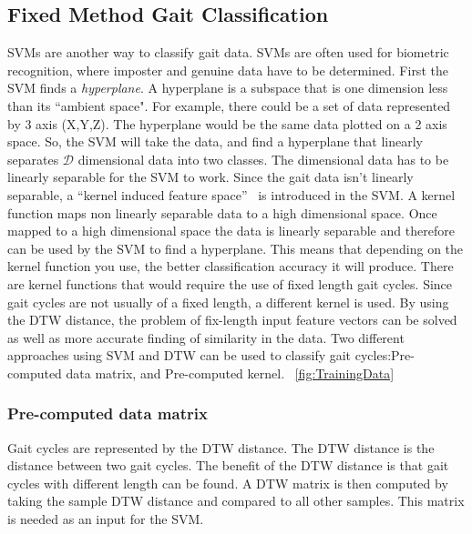 \documentclass{sig-alternate}
\begin{document}
\subsection{Fixed Method Gait Classification}\label{FMGC}
	SVMs are another way to classify gait data. SVMs are often used for biometric recognition, where imposter and genuine data have to be determined. First the SVM finds a \textit{hyperplane}. A hyperplane is a subspace that is one dimension less than its ``ambient space". For example, there could be a set of data represented by 3 axis (X,Y,Z). The hyperplane would be the same data plotted on a 2 axis space. So, the SVM will take the data, and find a hyperplane that linearly separates \begin{math}\mathcal{D} \end{math} dimensional data into two classes. The dimensional data has to be linearly separable for the SVM to work. Since the gait data isn't linearly separable, a ``kernel induced feature space''~\cite{Muaaz:2013} is introduced in the SVM. A kernel function maps non linearly separable data to a high dimensional space. Once mapped to a high dimensional space the data is linearly separable and therefore can be used by the SVM to find a hyperplane. This means that depending on the kernel function you use, the better classification accuracy it will produce. 
There are kernel functions that would require the use of fixed length gait cycles. Since gait cycles are not usually of a fixed length, a different kernel is used. By using the DTW distance, the problem of fix-length input feature vectors can be solved as well as more accurate finding of similarity in the data. Two different approaches using SVM and DTW can be used to classify gait cycles:Pre-computed data matrix, and Pre-computed kernel. ~\ref{fig:TrainingData}
\subsubsection{Pre-computed data matrix}
	Gait cycles are represented by the DTW distance. The DTW distance is the distance between two gait cycles. The benefit of the DTW distance is that gait cycles with different length can be found. A DTW matrix is then computed by taking the sample DTW distance and compared to all other samples. This matrix is needed as an input for the SVM.	
\end{document}
